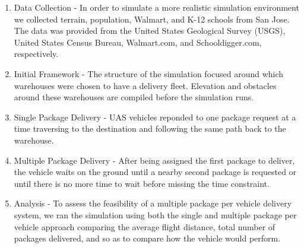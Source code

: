 \justify
\begin{enumerate}
\item{Data Collection - In order to simulate a more realistic simulation environment we collected terrain, population, Walmart, and K-12 schools from San Jose. The data was provided from the United States Geological Survey (USGS), United States Census Bureau, Walmart.com, and Schooldigger.com, respectively.}\\

\vspace{7mm}

\item{Initial Framework - The structure of the simulation focused around which warehouses were chosen to have a delivery fleet. Elevation and obstacles around these warehouses are compiled before the simulation runs.}

\vspace{7mm}

\item{Single Package Delivery - UAS vehicles reponded to one package request at a time traversing to the destination and following the same path back to the warehouse.}

\vspace{7mm}

\item{Multiple Package Delivery - After being assigned the first package to deliver, the vehicle waits on the ground until a nearby second package is requested or until there is no more time to wait before missing the time constraint.}

\vspace{7mm}

\item{Analysis - To assess the feasibility of a multiple package per vehicle delivery system, we ran the simulation using both the single and multiple package per vehicle approach comparing the average flight distance, total number of packages delivered, and so as to compare how the vehicle would perform.}
\end{enumerate}
